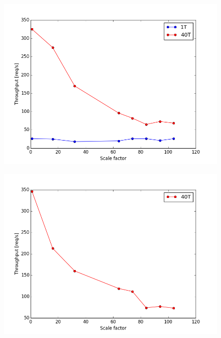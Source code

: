 \begin{figure}[h]
	\begin{minipage}{.5\textwidth}
		\centering
		\includegraphics[scale=0.42]{figures/results/vm115_large_wobs.png}
		\label{fig:vm115_large_wobs}
	\end{minipage}
	\begin{minipage}{.5\textwidth}
		\centering
		\includegraphics[scale=0.42]{figures/results/vm115_physical_wobs.png}
		\label{fig:vm115_physical_wobs}
	\end{minipage}
\end{figure}

